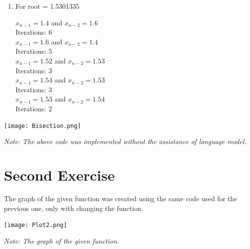 \documentclass{article}
\begin{document}
\begin{tcolorbox}[colback=blue!10, colframe=gray!80, width=\textwidth, sharp corners]
\begin{enumerate}
\begin{center}
\end{center}
\item For root = 1.5301335
\begin{center}

    $x_{n-1}=1.4$   and $x_{n-2} = 1.6 $\\
    Iterations: 6 \\
    \vspace{0.3cm}
    $x_{n-1}= 1.6$   and $x_{n-2} = 1.4  $\\
    Iterations: 5 \\
    \vspace{0.3cm}
    $x_{n-1}= 1.52$   and $x_{n-2} = 1.53 $\\
    Iterations: 3 \\
    \vspace{0.3cm}
    $x_{n-1}=1.54$   and $x_{n-2} = 1.53 $\\
    Iterations: 3 \\
    \vspace{0.3cm}
    $x_{n-1}=1.53$   and $x_{n-2} = 1.54 $\\
    Iterations: 2 \\
      
\end{center}

\end{enumerate}
\end{tcolorbox}


\begin{tcolorbox}[colback=gray!10, colframe=gray!80, width=\textwidth, sharp corners]
    \centering 
    \texttt{[image: Bisection.png]} 
    
    \vspace{0.5cm}
    \small\textit{Note: The above code was implemented without the assistance of language model.}
\end{tcolorbox}

    \vspace{0.5cm} 

\section{Second Exercise}

The graph of the given function was created using the same code used for the previous one, only with changing the function.

\begin{tcolorbox}[colback=gray!10, colframe=gray!80, width=\textwidth, sharp corners]
    \centering 
    \texttt{[image: Plot2.png]} 


    \vspace{0.5cm} 
    \small\textit{Note: The graph of the given function.}
    
    
\end{tcolorbox}
    \vspace{1cm} 
\end{document}
